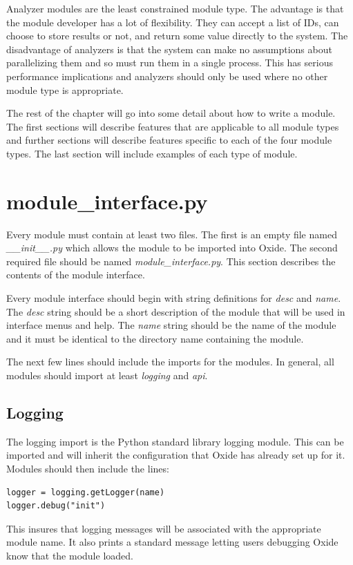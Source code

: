 \documentclass{book}
\begin{document}
Analyzer modules are the least constrained module type.  The advantage is that the module developer has a lot of flexibility.  They can accept a list of IDs, can choose to store results or not, and return some value directly to the system.  The disadvantage of analyzers is that the system can make no assumptions about parallelizing them and so must run them in a single process.  This has serious performance implications and analyzers should only be used where no other module type is appropriate.

The rest of the chapter will go into some detail about how to write a module.  The first sections will describe features that are applicable to all module types and further sections will describe features specific to each of the four module types.  The last section will include examples of each type of module.  
	
\section{module\_interface.py}

Every module must contain at least two files.  The first is an empty file named \emph{\_\_init\_\_.py} which allows the module to be imported into Oxide.  The second required file should be named \emph{module\_interface.py}.  This section describes the contents of the module interface.

Every module interface should begin with string definitions for \emph{desc} and \emph{name}.  The \emph{desc} string should be a short description of the module that will be used in interface menus and help.  The \emph{name} string should be the name of the module and it must be identical to the directory name containing the module.

The next few lines should include the imports for the modules.  In general, all modules should import at least \emph{logging} and \emph{api}.  

\subsection{Logging}
The logging import is the Python standard library logging module.  This can be imported and will inherit the configuration that Oxide has already set up for it.  
Modules should then include the lines:
\begin{verbatim}
logger = logging.getLogger(name)
logger.debug("init") 
\end{verbatim}
This insures that logging messages will be associated with the appropriate module name.  It also prints a standard message letting users debugging Oxide know that the module loaded.
\end{document}

